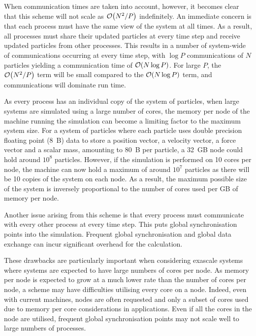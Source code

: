 %
When communication times are taken into account, however, it becomes
clear that this scheme will not scale as $\mathcal{O}{\left({ N^2/P }\right)}$ indefinitely.
%
An immediate concern is that each process must have the same view of the
system at all times.
%
As a result, all processes must share their updated particles at
every time step and receive updated particles from other processes.
%
This results in a number of system-wide of communications occurring
at every time step,
with $\log{P}$ communications of $N$ particles
yielding a communication time of $\mathcal{O}{\left({ N \log{P} }\right)}$.
%
For large $P$, the $\mathcal{O}{\left({ N^2/P }\right)}$ term will be small compared to the
$\mathcal{O}{\left({ N\log{P} }\right)}$ term, and communications will dominate run time.

As every process has an individual copy of the system of particles,
when large systems are simulated using a large number of cores,
the memory per node of the machine running the simulation
can become a limiting factor to the maximum system size.
%
For a system of particles where each particle uses double
precision floating point (8~B) data to store
a position vector,
a velocity vector,
a force vector and
a scalar mass,
amounting to 80~B per particle, a 32~GB node could hold around $10^8$
particles.
%
However, if the simulation is performed on 10 cores per node,
the machine can now hold a maximum of around $10^7$ particles
as there will be 10 copies of the system on each node.
%
As a result, the maximum possible size of the system is
inversely proportional to
the number of cores used per GB of memory per node.

Another issue arising from this scheme is
that every process must communicate with
every other process at every time step.
%
This puts global synchronisation points into the simulation.
%
Frequent global synchronisation and global data exchange can incur
significant overhead for the calculation.

%
These drawbacks are particularly important when considering exascale systems
where systems are expected to have large numbers of cores per node.
%
As memory per node is expected to grow at a much lower rate than
the number of cores per node,
a \replicateddata{} scheme may have difficulties
utilising every core on a node.
%
Indeed, even with current machines, nodes are often requested and only a
subset of cores used due to memory per core considerations in applications.
%
Even if all the cores in the node are utilised, frequent global synchronisation
points may not scale well to large numbers of processes.

